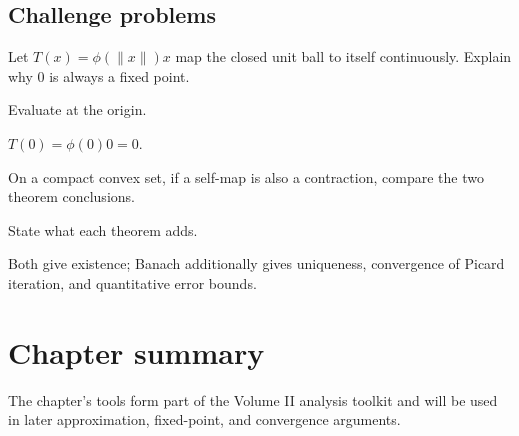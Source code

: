 \subsection*{Challenge problems}

\begin{exercise}\label{exr:ii17-expand-15}
Let \(T(x)=\phi(\|x\|)x\) map the closed unit ball to itself continuously. Explain why \(0\) is always a fixed point.
\end{exercise}
\begin{hint}
Evaluate at the origin.
\end{hint}
\begin{solution}
\(T(0)=\phi(0)0=0\).
\end{solution}

\begin{exercise}\label{exr:ii17-expand-16}
On a compact convex set, if a self-map is also a contraction, compare the two theorem conclusions.
\end{exercise}
\begin{hint}
State what each theorem adds.
\end{hint}
\begin{solution}
Both give existence; Banach additionally gives uniqueness, convergence of Picard iteration, and quantitative error bounds.
\end{solution}
\section*{Chapter summary}
The chapter's tools form part of the Volume II analysis toolkit and will be used in later approximation, fixed-point, and convergence arguments.
